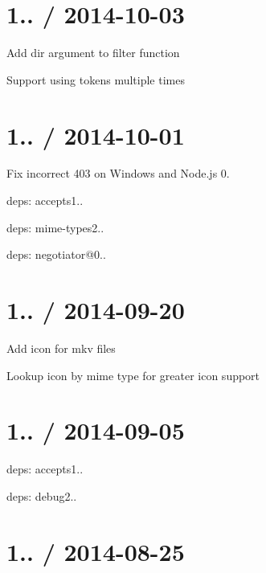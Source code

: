 \section*{1.. / 2014-\/10-\/03 }


\begin{DoxyItemize}
\item Add {\ttfamily dir} argument to {\ttfamily filter} function
\item Support using tokens multiple times
\end{DoxyItemize}

\section*{1.. / 2014-\/10-\/01 }


\begin{DoxyItemize}
\item Fix incorrect 403 on Windows and Node.\+js 0.
\item deps\+: accepts1..
\begin{DoxyItemize}
\item deps\+: mime-\/types2..
\item deps\+: negotiator@0..
\end{DoxyItemize}
\end{DoxyItemize}

\section*{1.. / 2014-\/09-\/20 }


\begin{DoxyItemize}
\item Add icon for mkv files
\item Lookup icon by mime type for greater icon support
\end{DoxyItemize}

\section*{1.. / 2014-\/09-\/05 }


\begin{DoxyItemize}
\item deps\+: accepts1..
\item deps\+: debug2..
\end{DoxyItemize}

\section*{1.. / 2014-\/08-\/25 }



